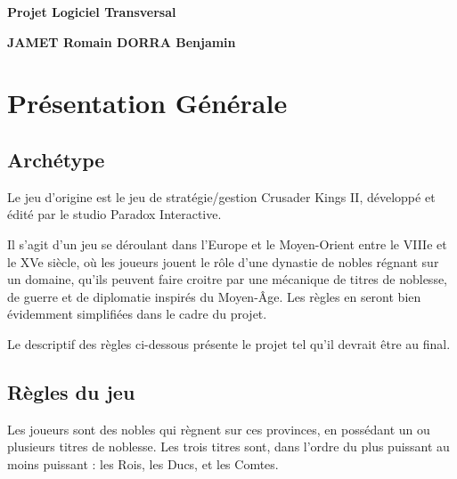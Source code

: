 \documentclass[a4paper,12pt]{article}
\begin{document}
\thispagestyle{empty}

\begin{titlepage}

\vspace*{2cm}

\begin{center}\textbf{\Huge Projet Logiciel Transversal}\end{center}{\Large \par}

\begin{center}\textbf{\large JAMET Romain DORRA Benjamin}\end{center}{\large \par}

\vspace{2cm}


\clearpage

{\small
\tableofcontents
}

\end{titlepage}

\clearpage
\section{Présentation Générale}

\subsection{Archétype}
Le jeu d’origine est le jeu de stratégie/gestion Crusader Kings II, développé et édité par le studio Paradox Interactive. 

Il s’agit d’un jeu se déroulant dans l’Europe et le Moyen-Orient entre le VIIIe et le XVe siècle, où les joueurs jouent le rôle d’une dynastie de nobles régnant sur un domaine, qu’ils peuvent faire croitre par une mécanique de titres de noblesse, de guerre et de diplomatie inspirés du Moyen-Âge. 
Les règles en seront bien évidemment simplifiées dans le cadre du projet. 

Le descriptif des règles ci-dessous présente le projet tel qu’il devrait être au final. \\

\subsection{Règles du jeu}
Les joueurs sont des nobles qui règnent sur ces provinces, en possédant un ou plusieurs titres de noblesse. Les trois titres sont, dans l'ordre du plus puissant au moins puissant : les Rois, les Ducs, et les Comtes.
\end{document}
